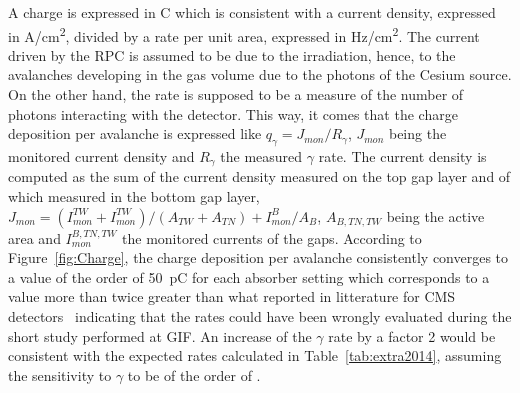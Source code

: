 	A charge is expressed in \si{C} which is consistent with a current density, expressed in \si{A/cm^2}, divided by a rate per unit area, expressed in \si{Hz/cm^2}. The current driven by the RPC is assumed to be due to the irradiation, hence, to the avalanches developing in the gas volume due to the photons of the Cesium source. On the other hand, the rate is supposed to be a measure of the number of photons interacting with the detector. This way, it comes that the charge deposition per avalanche is expressed like $q_\gamma = J_{mon}/R_\gamma$, $J_{mon}$ being the monitored current density and $R_\gamma$ the measured $\gamma$ rate. The current density is computed as the sum of the current density measured on the top gap layer and of which measured in the bottom gap layer, $J_{mon} = (I_{mon}^{TW}+I_{mon}^{TW})/(A_{TW}+A_{TN}) + I_{mon}^B/A_B$, $A_{B,TN,TW}$ being the active area and $I_{mon}^{B,TN,TW}$ the monitored currents of the gaps. According to Figure~\ref{fig:Charge}, the charge deposition per avalanche consistently converges to a value of the order of \SI{50}{pC} for each absorber setting which corresponds to a value more than twice greater than what reported in litterature for CMS detectors~\cite{PUGLIESE2002,PUGLIESE2003} indicating that the rates could have been wrongly evaluated during the short study performed at GIF. An increase of the $\gamma$ rate by a factor 2 would be consistent with the expected rates calculated in Table~\ref{tab:extra2014}, assuming the sensitivity to $\gamma$ to be of the order of .
	
